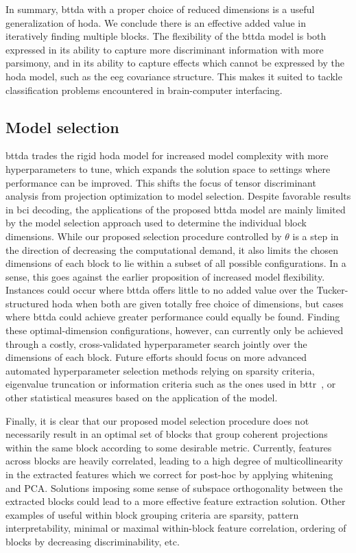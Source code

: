 \documentclass[twocolumn]{article}
\begin{document}
In summary, \ac{bttda} with a proper choice of reduced dimensions is a useful generalization
of \ac{hoda}.
We conclude there is an effective	added value in iteratively finding multiple blocks.
The flexibility of the \ac{bttda} model is both expressed in its ability
to capture more discriminant information with more parsimony,
and in its ability to capture effects which cannot be expressed by the \ac{hoda}
model, such as the \ac{eeg} covariance structure.
This makes it suited to tackle classification problems encountered in
brain-computer interfacing.

\subsection{Model selection}

\Ac{bttda} trades the rigid \ac{hoda} model for increased model complexity with more
hyperparameters to tune, which expands the solution space to settings where performance can be
improved.
This shifts the focus of tensor discriminant analysis from projection
optimization to model selection.
Despite favorable results in \ac{bci} decoding, the applications of the proposed
\ac{bttda} model are mainly limited by the model selection approach used
to determine the individual block dimensions.
While our proposed selection procedure controlled by $\theta$
is a step in the direction of decreasing the computational demand, it
also limits the chosen dimensions of each block to lie within a subset of all possible configurations.
In a sense, this goes against the earlier proposition of increased model flexibility.
Instances could occur where \ac{bttda} offers little to no added value over the
Tucker-structured \ac{hoda} when both are given totally free choice of dimensions, but cases where \ac{bttda} could achieve greater performance could equally be found.
Finding these optimal-dimension configurations, however, can currently only be achieved
through a costly, cross-validated hyperparameter search jointly over the dimensions
of each block.
Future efforts should focus on more advanced automated hyperparameter selection
methods relying on sparsity criteria, eigenvalue truncation or information
criteria such as the ones used in \ac{bttr}~\cite{Faes2022}, or other
statistical measures based on the application of the model.

Finally, it is clear that our proposed model selection procedure does not
necessarily result in an optimal set of blocks that group coherent projections
within the same block according to some desirable metric.
Currently, features across blocks are heavily correlated, leading to a high
degree of multicollinearity in the extracted features which we correct for post-hoc
by applying whitening and PCA.
Solutions imposing some sense of subspace orthogonality between the extracted blocks
could lead to a more effective feature extraction solution.
Other examples of useful within block grouping criteria are sparsity,
pattern interpretability, minimal or maximal within-block feature correlation,
ordering of blocks by decreasing discriminability, etc.
\end{document}

